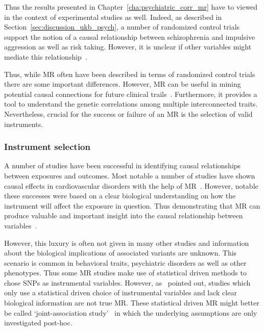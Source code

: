 Thus the results presented in Chapter~\ref{cha:psychiatric_corr_mr} have to viewed in the context of experimental studies as well.
Indeed, as described in Section~\ref{sec:discussion_ukb_psych}, a number of randomized control trials support the notion of a causal relationship between schizophrenia and impulsive aggression as well as risk taking. 
However, it is unclear if other variables might mediate this relationship~\cite{Evans2015}.

Thus, while MR often have been described in terms of randomized control trials there are some important differences.
However, MR can be useful in mining potential causal connections for future clinical trails~\cite{Evans2015}. 
Furthermore, it provides a tool to understand the genetic correlations among multiple interconnected traits. 
Nevertheless, crucial for the success or failure of an MR is the selection of valid instruments.

\subsubsection{Instrument selection}
\label{ssub:instrument_selection}

A number of studies have been successful in identifying causal relationships between exposures and outcomes.
Most notable a number of studies have shown causal effects in cardiovascular disorders with the help of MR~\cite{Swerdlow,Ference2015,Lieb2013,Voight2012a}.
However, notable these successes were based on a clear biological understanding on how the instrument will affect the exposure in question.
Thus demonstrating that MR can produce valuable and important insight into the causal relationship between variables~\cite{Swerdlow}.

However, this luxury is often not given in many other studies and information about the biological implications of associated variants are unknown.
This scenario is common in behavioral traits, psychiatric disorders as well as other phenotypes.
Thus some MR studies make use of statistical driven methods to chose SNPs as instrumental variables.
However, as~\citet{Burgess2016a} pointed out, studies which only use a statistical driven choice of instrumental variables and lack clear biological information are not true MR\@.
These statistical driven MR might better be called `joint-association study'~\citet{Burgess2016a} in which the underlying assumptions are only investigated post-hoc.

